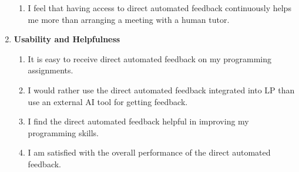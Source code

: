\documentclass[sigconf,screen,review,anonymous]{acmart}
\begin{document}
\begin{enumerate}[label=\textbf{RQ\arabic*}]
\begin{enumerate}[label=\textbf{Q\arabic*},resume,ref=Q\arabic*, leftmargin=*, itemindent=1.5em]
      \item \label{Q9} I feel that having access to direct automated feedback continuously helps me more than arranging a meeting with a human tutor.
    \end{enumerate}
  \item \textbf{Usability and Helpfulness}
    \begin{enumerate}[label=\textbf{Q\arabic*},resume,ref=Q\arabic*, leftmargin=*, itemindent=1.5em]
      \item \label{Q10} It is easy to receive direct automated feedback on my programming assignments.
      \item \label{Q11} I would rather use the direct automated feedback integrated into LP than use an external AI tool for getting feedback.
      \item \label{Q12} I find the direct automated feedback helpful in improving my programming skills.
      \item \label{Q13} I am satisfied with the overall performance of the direct automated feedback.
    \end{enumerate}
\end{enumerate}



\end{document}
